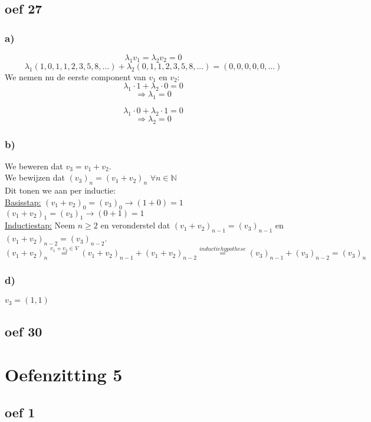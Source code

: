 \documentclass[lineaire_algebra_oplossingen.tex]{subfiles}
\begin{document}
\subsection*{oef 27}
\subsubsection*{a)}
$$\lambda_1 v_1 = \lambda_2 v_2 = 0$$
$$\lambda_1(1,0,1,1,2,3,5,8,...) + \lambda_2(0,1,1,2,3,5,8,...)=(0,0,0,0,0,...)$$
We nemen nu de eerste component van $v_1$ en $v_2$:
$$\lambda_1 \cdot 1 + \lambda_2 \cdot 0 = 0$$
$$\Rightarrow \lambda_1 = 0$$

$$\lambda_1 \cdot 0 + \lambda_2 \cdot 1 = 0$$
$$\Rightarrow \lambda_2 = 0$$
\subsubsection*{b)}
We beweren dat $v_3 = v_1 + v_2$.\\
We bewijzen dat $(v_3)_n = (v_1 + v_2)_n$ \hspace{5pt} $\forall n \in \mathbb{N}$\\
Dit tonen we aan per inductie:\\
\underline{Basisstap:} $(v_1 + v_2)_0 = (v_3)_0 \rightarrow (1 + 0) = 1$\\
\hspace*{4.5em} $(v_1 + v_2)_1 = (v_3)_1 \rightarrow (0 + 1) = 1$\\
\underline{Inductiestap:} Neem $n \geq 2$ en veronderstel dat $(v_1 + v_2)_{n-1} = (v_3)_{n-1}$ en $(v_1 + v_2)_{n-2} = (v_3)_{n-2}$.\\
\[
(v_1 + v_2)_n \overset{v_1 + v_2 \in V}{=} (v_1 + v_2)_{n-1} + (v_1 + v_2)_{n-2} \overset{inductiehypothese}{=} (v_3)_{n-1} + (v_3)_{n-2} = (v_3)_n
\]
\subsubsection*{d)}
$v_3 = (1,1)$

\subsection*{oef 30}


\section{Oefenzitting 5}
\subsection*{oef 1}
\end{document}
